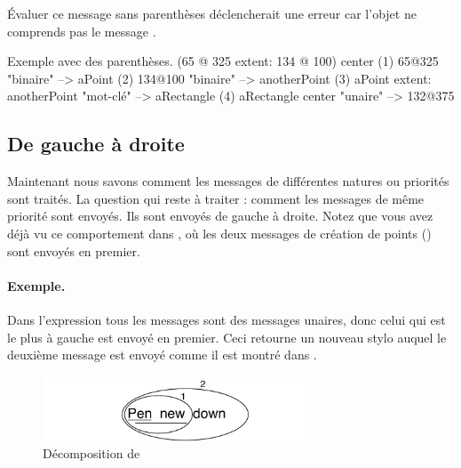 \documentclass[a4paper,10pt,twoside]{book}
\begin{document}
\'Evaluer ce message sans parenth\`eses d\'eclencherait une erreur car l'objet  ne comprends pas le message .

\begin{example}[decExtent]{Exemple avec des parenth\`eses.}{}
      (65 @ 325 extent: 134 @ 100) center
(1)   65@325                                                    "binaire"
    --> aPoint
(2)                                134@100                     "binaire"
                                 --> anotherPoint
(3)   aPoint extent: anotherPoint                       "mot-cl\'e"
      --> aRectangle
(4)   aRectangle center                                     "unaire"
      --> 132@375
\end{example}

\subsection{De gauche \`a droite}
Maintenant nous savons comment les messages de diff\'erentes natures ou priorit\'es sont trait\'es. La question qui reste \`a traiter : comment les messages de m\^eme priorit\'e sont envoy\'es. Ils sont envoy\'es de gauche \`a droite. Notez que vous avez d\'ej\`a vu ce comportement dans , o\`u les deux messages de cr\'eation de points () sont envoy\'es en premier.



\paragraph{Exemple.} Dans l'expression  tous les messages sont des messages unaires, donc celui qui est le plus \`a gauche  est envoy\'e en premier. Ceci retourne un nouveau stylo auquel le deuxi\`eme message  est envoy\'e  comme il est montr\'e dans .

\begin{figure}
	\centering
	\includegraphics[width=8cm]{ucompoUn}
	\caption{D\'ecomposition de \label{fig:unaryMessages}}
\end{figure}
\end{document}
